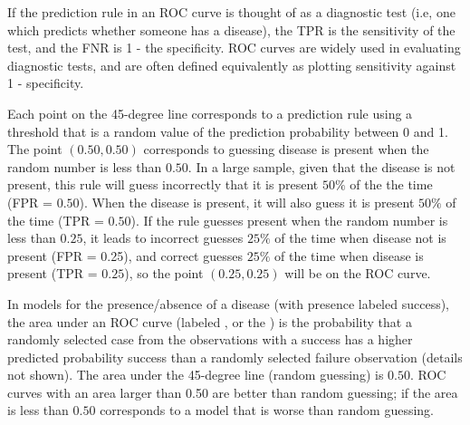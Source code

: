If the prediction rule in an ROC curve is thought of as a diagnostic test (i.e, one which predicts whether someone has a disease), the TPR is the sensitivity of the test, and the FNR is 1 - the specificity.  ROC curves are widely used in evaluating diagnostic tests, and are often defined equivalently as plotting sensitivity against 1 - specificity.

Each point on the 45-degree line corresponds to a prediction rule using a threshold that is a random value of the prediction probability between 0 and 1. The point $(0.50, 0.50)$ corresponds to guessing disease is present when the random number is less than $0.50$.  In a large sample, given that the disease is not present, this rule will guess incorrectly that it is present $50\%$ of the the time (FPR = $0.50$).  When the disease is present, it will also guess it is present $50\%$ of the time (TPR = $0.50$). If the rule guesses present when the random number is less than $0.25$, it leads to incorrect guesses $25\%$ of the time when disease not is present (FPR = 0.25), and correct guesses $25\%$ of the time when disease is present (TPR = $0.25$), so the point $(0.25, 0.25)$ will be on the ROC curve.  

In models for the presence/absence of a disease (with presence labeled success), the area under an ROC curve (labeled ,   or the ) is the probability that a randomly selected case from the observations with a success has a higher predicted probability success than a randomly selected failure observation (details not shown).  The area under the 45-degree line (random guessing) is $0.50$.  ROC curves with an area larger than 0.50 are better than random guessing; if the area is less than $0.50$ corresponds to a model that is worse than random guessing.  


